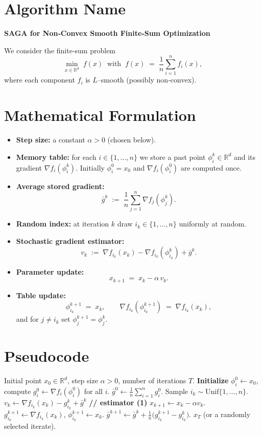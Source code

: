 \documentclass[11pt]{article}
\newcommand{\RR}{\mathbb{R}}
\newcommand{\grad}{\nabla}
\begin{document}
\section*{Algorithm Name}
\textbf{SAGA for Non‑Convex Smooth Finite‑Sum Optimization}  

We consider the finite‑sum problem  
\[
\min_{x\in\RR^{d}} \; f(x)\;\; \text{with}\;\; 
f(x)\;=\;\frac1n\sum_{i=1}^{n} f_i(x),
\]
where each component $f_i$ is $L$–smooth (possibly non‑convex).

\section*{Mathematical Formulation}
\begin{itemize}
    \item \textbf{Step size:} a constant $\alpha>0$ (chosen below).
    \item \textbf{Memory table:} for each $i\in\{1,\dots,n\}$ we store a past point 
    $\phi_i^k\in\RR^{d}$ and its gradient $\grad f_i(\phi_i^k)$.  
    Initially $\phi_i^0 = x_0$ and $\grad f_i(\phi_i^0)$ are computed once.
    \item \textbf{Average stored gradient:}
    \[
        \bar{g}^k \;:=\; \frac1n\sum_{j=1}^{n}\grad f_j(\phi_j^k).
    \]
    \item \textbf{Random index:} at iteration $k$ draw $i_k\in\{1,\dots,n\}$
    uniformly at random.
    \item \textbf{Stochastic gradient estimator:}
    \[
        v_k \;:=\; \grad f_{i_k}(x_k)-\grad f_{i_k}(\phi_{i_k}^k)+\bar{g}^k .
    \]
    \item \textbf{Parameter update:}
    \[
        x_{k+1}\;=\;x_k-\alpha\, v_k .
    \tag{1}
    \]
    \item \textbf{Table update:}
    \[
        \phi_{i_k}^{k+1}\;=\;x_k,\qquad 
        \grad f_{i_k}(\phi_{i_k}^{k+1})\;=\;\grad f_{i_k}(x_k),
    \]
    and for $j\neq i_k$ set $\phi_j^{k+1}=\phi_j^{k}$.
\end{itemize}

\section*{Pseudocode}
\begin{algorithm}[H]
\caption{SAGA (non‑convex)}\label{alg:saga}
\begin{algorithmic}[1]
\REQUIRE Initial point $x_0\in\RR^{d}$, step size $\alpha>0$, number of iterations $T$.
\STATE \textbf{Initialize} $\phi_i^0 \gets x_0$, compute $g_i^0\gets\grad f_i(\phi_i^0)$ for all $i$.
\STATE $\bar g^0 \gets \frac1n\sum_{i=1}^{n} g_i^0$.
    \STATE Sample $i_k\sim\text{Unif}\{1,\dots,n\}$.
    \STATE $v_k \gets \grad f_{i_k}(x_k)-g_{i_k}^k+\bar g^k$ \hfill\textbf{// estimator (1)}
    \STATE $x_{k+1} \gets x_k-\alpha v_k$.
    \STATE $g_{i_k}^{k+1} \gets \grad f_{i_k}(x_k)$,
          $\phi_{i_k}^{k+1}\gets x_k$.
    \STATE $\bar g^{k+1}\gets \bar g^{k}+ \frac1n\big(g_{i_k}^{k+1}-g_{i_k}^{k}\big)$.
\ENDFOR
\RETURN $x_T$ (or a randomly selected iterate).
\end{algorithmic}
\end{algorithm}
\end{document}
